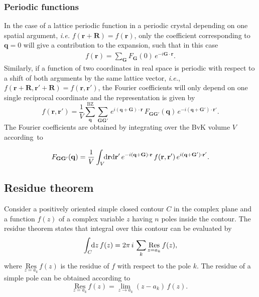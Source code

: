 \subsubsection{Periodic functions}
In the case of a lattice periodic function  in a periodic crystal depending on one spatial argument, \textit{i.e.} $f(\mathbf{r+R})=f(\mathbf{r})$, only the coefficient corresponding to $\mathbf{q}=0$ will give a contribution to the expansion, such that in this case
%
\begin{align}
    f(\mathbf{r}) = \sum_\mathbf{G}F_\mathbf{G}(0)\,e^{-i\mathbf{G\cdot r}}.
\end{align}
%
Similarly, if a function of two coordinates in real space is periodic with respect to a shift of both arguments by the same lattice vector, \textit{i.e.}, $f(\mathbf{r+R,r'+R})=f(\mathbf{r,r'})$, the Fourier coefficients will only depend on one single reciprocal coordinate and the representation is given by
%
\begin{equation}\label{fourier_periodic}
     f(\mathbf{r,r'}) = \frac{1}{V}\sum^\text{BZ}_\mathbf{q}\sum_\mathbf{GG'}\,e^{i\mathbf{(q+G)\cdot r}}\,F_\mathbf{GG'}(\mathbf{q})\,e^{-i\mathbf{(q+G')\cdot r'}}.
\end{equation}
%
\newpage
\noindent The Fourier coefficients are obtained by integrating over the BvK volume $V$ according~to

%
\begin{align}\label{fourier_coeff_periodic}
      F_\mathbf{GG'}(\mathbf{q}) = \frac{1}{V}\int_V \text{\!\!d}\mathbf{r}\text{d}\mathbf{r'}\,e^{-i\mathbf{(q+G)\cdot r}}\,f(\mathbf{r,r'})\,e^{i\mathbf{(q+G')\cdot r'}}.
\end{align}


\subsection{Residue theorem}\label{residue}
Consider a positively oriented simple closed contour $C$ in the complex plane and a function $f(z)$ of a complex variable $z$ having $n$ poles inside the contour. The residue theorem states that integral over this contour can be evaluated by 
%
\begin{align}
    \int_C \text{\!\!d}z\,f(z) = 2\pi\,i\,\sum_k \underset{z=a_k}{\text{Res}}\,f(z),
\end{align}
%
where $\underset{z=a_k}{\text{Res}}\,f(z)$ is the residue of $f$ with respect to the pole $k$. The residue of a simple pole can be obtained according to
%
\begin{equation}\label{residue_pole}
   \underset{z=a_k}{\text{Res}}\,f(z) = \lim_{z\rightarrow a_k}(z-a_k)\,f(z).
\end{equation}

